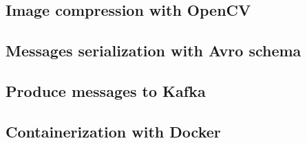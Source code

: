 \subsection{Image compression with OpenCV}
\label{sec:edge_image_compression}

\subsection{Messages serialization with Avro schema}
\label{sec:edge_message_serialization}

\subsection{Produce messages to Kafka}
\label{sec:edge_produce_messages}

\subsection{Containerization with Docker}
\label{sec:edge_containerization}